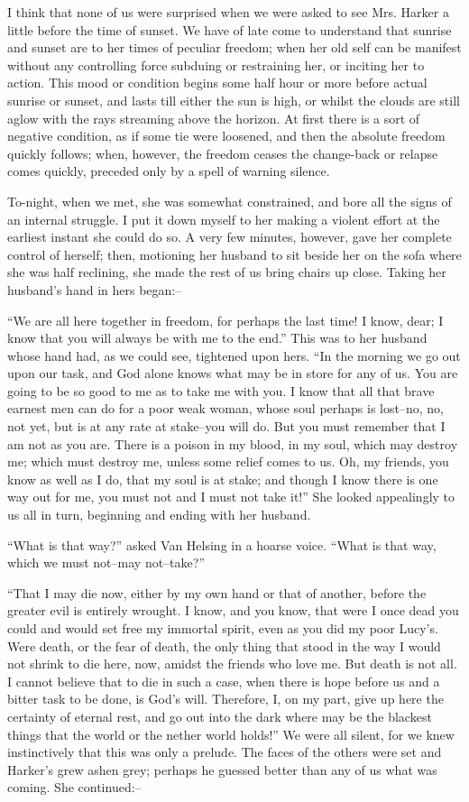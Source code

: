 \documentclass[12pt,openright]{book}
\begin{document}
I think that none of us were surprised when we were asked to see Mrs. Harker a little before the time of sunset. We have of late come to understand that sunrise and sunset are to her times of peculiar freedom; when her old self can be manifest without any controlling force subduing or restraining her, or inciting her to action. This mood or condition begins some half hour or more before actual sunrise or sunset, and lasts till either the sun is high, or whilst the clouds are still aglow with the rays streaming above the horizon. At first there is a sort of negative condition, as if some tie were loosened, and then the absolute freedom quickly follows; when, however, the freedom ceases the change-back or relapse comes quickly, preceded only by a spell of warning silence.

To-night, when we met, she was somewhat constrained, and bore all the signs of an internal struggle. I put it down myself to her making a violent effort at the earliest instant she could do so. A very few minutes, however, gave her complete control of herself; then, motioning her husband to sit beside her on the sofa where she was half reclining, she made the rest of us bring chairs up close. Taking her husband’s hand in hers began:–

“We are all here together in freedom, for perhaps the last time! I know, dear; I know that you will always be with me to the end.” This was to her husband whose hand had, as we could see, tightened upon hers. “In the morning we go out upon our task, and God alone knows what may be in store for any of us. You are going to be so good to me as to take me with you. I know that all that brave earnest men can do for a poor weak woman, whose soul perhaps is lost–no, no, not yet, but is at any rate at stake–you will do. But you must remember that I am not as you are. There is a poison in my blood, in my soul, which may destroy me; which must destroy me, unless some relief comes to us. Oh, my friends, you know as well as I do, that my soul is at stake; and though I know there is one way out for me, you must not and I must not take it!” She looked appealingly to us all in turn, beginning and ending with her husband.

“What is that way?” asked Van Helsing in a hoarse voice. “What is that way, which we must not–may not–take?”

“That I may die now, either by my own hand or that of another, before the greater evil is entirely wrought. I know, and you know, that were I once dead you could and would set free my immortal spirit, even as you did my poor Lucy’s. Were death, or the fear of death, the only thing that stood in the way I would not shrink to die here, now, amidst the friends who love me. But death is not all. I cannot believe that to die in such a case, when there is hope before us and a bitter task to be done, is God’s will. Therefore, I, on my part, give up here the certainty of eternal rest, and go out into the dark where may be the blackest things that the world or the nether world holds!” We were all silent, for we knew instinctively that this was only a prelude. The faces of the others were set and Harker’s grew ashen grey; perhaps he guessed better than any of us what was coming. She continued:–
\end{document}
